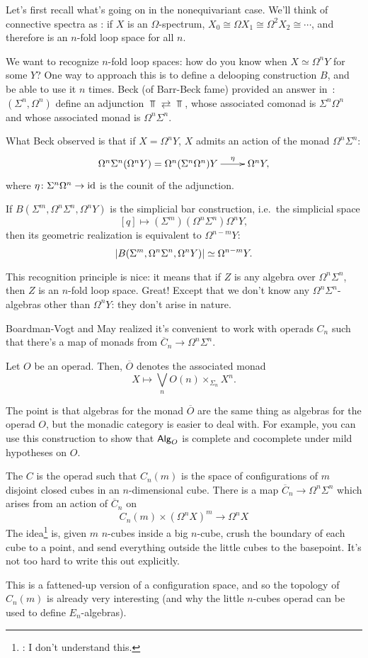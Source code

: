 Let's first recall what's going on in the nonequivariant case. We'll think of connective spectra as : if $X$ is an $\Omega$-spectrum, $X_0 \cong \Omega X_1 \cong \Omega^2 X_2 \cong \dotsb$, and therefore
is an $n$-fold loop space for all $n$.

We want to recognize $n$-fold loop spaces: how do you know when $X\simeq\Omega^n Y$ for some $Y$? One way to
approach this is to define a delooping construction $B$, and be able to use it $n$ times. Beck (of Barr-Beck fame)
provided an answer in~\cite{Beck}: $(\Sigma^n, \Omega^n)$ define an adjunction $\Top\rightleftarrows\Top$, whose
associated comonad is $\Sigma^n\Omega^n$ and whose associated monad is $\Omega^n\Sigma^n$.

What Beck observed is that if $X = \Omega^n Y$, $X$ admits an action of the monad $\Omega^n\Sigma^n$:
\[\xymatrix{
	\Omega^n\Sigma^n (\Omega^n Y) = \Omega^n (\Sigma^n\Omega^n) Y\ar[r]^-\eta &\Omega^n Y,
}\]
where $\eta\colon\Sigma^n\Omega^n\to\mathrm{id}$ is the counit of the adjunction.
\begin{thm}
If $B(\Sigma^m, \Omega^n\Sigma^n, \Omega^n Y)$ is the simplicial bar construction, i.e.\ the simplicial space
\[[q]\mapsto (\Sigma^m)(\Omega^n\Sigma^n)\Omega^n Y,\]
then its geometric realization is equivalent to $\Omega^{n-m}Y$:
\[\lvert B(\Sigma^m, \Omega^n\Sigma^n, \Omega^n Y)\rvert\simeq \Omega^{n-m}Y.\]
\end{thm}
This recognition principle is nice: it means that if $Z$ is any algebra over $\Omega^n\Sigma^n$, then $Z$ is an
$n$-fold loop space. Great! Except that we don't know any $\Omega^n\Sigma^n$-algebras other than $\Omega^n Y$: they
don't arise in nature.

Boardman-Vogt and May realized it's convenient to work with operads $C_n$ such that there's a map of monads from
$\overline C_n\to\Omega^n\Sigma^n$.
\begin{defn}
Let $O$ be an operad. Then, $\overline O$ denotes the associated monad
\[X\mapsto\bigvee_n O(n)\times_{\Sigma_n} X^n.\]
\end{defn}
The point is that algebras for the monad $\overline O$ are the same thing as algebras for the operad $O$, but the
monadic category is easier to deal with. For example, you can use this construction to show that $\mathsf{Alg}_O$ is
complete and cocomplete under mild hypotheses on $O$.
\begin{exm}
The  $C$ is the operad such that $C_n(m)$ is the space of configurations of $m$
disjoint closed cubes in an $n$-dimensional cube. There is a map $\overline C_n\to\Omega^n\Sigma^n$ which arises
from an action of $\overline C_n$ on
\[C_n(m)\times (\Omega^n X)^m\to \Omega^n X\]
The idea\footnote{\TODO: I don't understand this.} is, given $m$ $n$-cubes inside a big $n$-cube, crush the
boundary of each cube to a point, and send everything outside the little cubes to the basepoint. It's not too hard
to write this out explicitly.
\end{exm}
This is a fattened-up version of a configuration space, and so the topology of $C_n(m)$ is already very interesting
(and why the little $n$-cubes operad can be used to define $E_n$-algebras).


